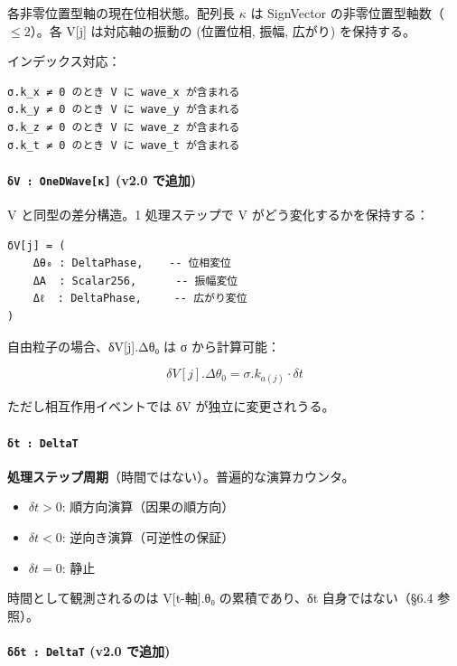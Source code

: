 \documentclass[a4paper,11pt]{ltjsarticle}
\providecommand{\tightlist}{\setlength{\itemsep}{0pt}\setlength{\parskip}{0pt}}
\begin{document}
各非零位置型軸の現在位相状態。配列長 \(\kappa\) は SignVector
の非零位置型軸数（\(\leq 2\)）。各 V{[}j{]} は対応軸の振動の (位置位相,
振幅, 広がり) を保持する。

インデックス対応：

\begin{verbatim}
σ.k_x ≠ 0 のとき V に wave_x が含まれる
σ.k_y ≠ 0 のとき V に wave_y が含まれる
σ.k_z ≠ 0 のとき V に wave_z が含まれる
σ.k_t ≠ 0 のとき V に wave_t が含まれる
\end{verbatim}

\paragraph{\texorpdfstring{\texttt{δV\ :\ OneDWave{[}κ{]}} (v2.0
で追加)}{δV : OneDWave{[}κ{]} (v2.0 で追加)}}\label{ux3b4v-onedwaveux3ba-v2.0-ux3067ux8ffdux52a0}

V と同型の差分構造。1 処理ステップで V がどう変化するかを保持する：

\begin{verbatim}
δV[j] = (
    Δθ₀ : DeltaPhase,    -- 位相変位
    ΔA  : Scalar256,      -- 振幅変位
    Δℓ  : DeltaPhase,     -- 広がり変位
)
\end{verbatim}

自由粒子の場合、δV{[}j{]}.Δθ₀ は σ から計算可能：

\[\delta V[j].\Delta\theta_0 = \sigma.k_{a(j)} \cdot \delta t\]

ただし相互作用イベントでは δV が独立に変更されうる。

\paragraph{\texorpdfstring{\texttt{δt\ :\ DeltaT}}{δt : DeltaT}}\label{ux3b4t-deltat}

\textbf{処理ステップ周期}（時間ではない）。普遍的な演算カウンタ。

\begin{itemize}
\tightlist
\item
  \(\delta t > 0\): 順方向演算（因果の順方向）
\item
  \(\delta t < 0\): 逆向き演算（可逆性の保証）
\item
  \(\delta t = 0\): 静止
\end{itemize}

時間として観測されるのは V{[}t-軸{]}.θ₀ の累積であり、δt
自身ではない（§6.4 参照）。

\paragraph{\texorpdfstring{\texttt{δδt\ :\ DeltaT} (v2.0
で追加)}{δδt : DeltaT (v2.0 で追加)}}\label{ux3b4ux3b4t-deltat-v2.0-ux3067ux8ffdux52a0}
\end{document}
